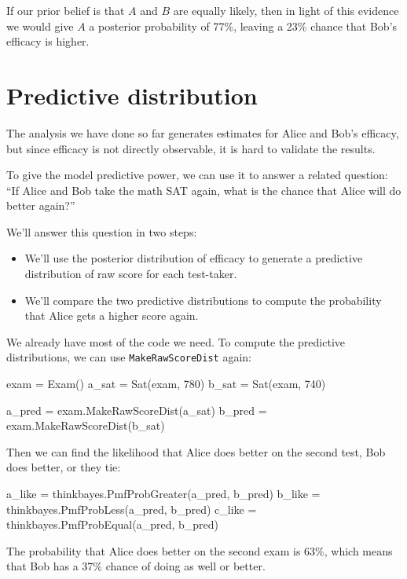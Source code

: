 \documentclass[12pt]{book}
\theoremstyle{exercise}
\begin{document}
If our prior belief is that $A$ and $B$ are equally likely,
then in light of this evidence we would give $A$ a posterior
probability of 77\%, leaving a 23\% chance that Bob's efficacy
is higher.


\section{Predictive distribution}

The analysis we have done so far generates estimates for
Alice and Bob's efficacy, but since efficacy is not directly
observable, it is hard to validate the results.

To give the model predictive power, we can use it to answer
a related question: ``If Alice and Bob take the math SAT
again, what is the chance that Alice will do better again?''

We'll answer this question in two steps:

\begin{itemize}

\item We'll use the posterior distribution of efficacy to
generate a predictive distribution of raw score for each test-taker.

\item We'll compare the two predictive distributions to compute
the probability that Alice gets a higher score again.

\end{itemize}

We already have most of the code we need.  To compute
the predictive distributions, we can use \verb"MakeRawScoreDist" again:

\begin{code}
    exam = Exam()
    a_sat = Sat(exam, 780)
    b_sat = Sat(exam, 740)

    a_pred = exam.MakeRawScoreDist(a_sat)
    b_pred = exam.MakeRawScoreDist(b_sat)
\end{code}

Then we can find the likelihood that Alice does better on the second
test, Bob does better, or they tie:

\begin{code}
    a_like = thinkbayes.PmfProbGreater(a_pred, b_pred)
    b_like = thinkbayes.PmfProbLess(a_pred, b_pred)
    c_like = thinkbayes.PmfProbEqual(a_pred, b_pred)
\end{code}

The probability that Alice does better on the second exam is 63\%,
which means that Bob has a 37\% chance of doing as well or better.
\end{document}
